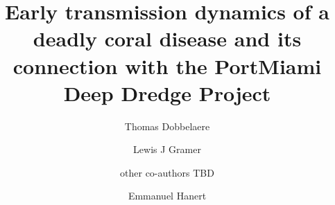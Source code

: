 \documentclass[preprint,12pt,authoryear]{elsarticle}
\begin{document}
\begin{frontmatter}



    \title{Early transmission dynamics of a deadly coral disease and its connection with the PortMiami Deep Dredge Project}%
% 
% 
% 

    \author[eli]{Thomas Dobbelaere}
    \author[cimas,aoml]{Lewis J Gramer}
    \author[]{other co-authors TBD}
    \author[eli,immc]{Emmanuel Hanert}


\end{frontmatter}
\end{document}
